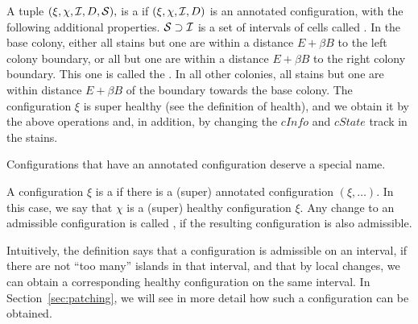 \documentclass[12pt]{memoir}
\newcommand{\fld}[1]{\ensuremath{\textit{#1}}}
\def\B{B}
\newcommand{\D}{D}
\newcommand{\E}{E}
\newcommand{\cInfo}{\fld{cInfo}}
\newcommand{\cState}{\fld{cState}}
\begin{document}
\begin{definition}\label{def:super-annotated}
A tuple \( (\xi,\chi,\cI,\D,\cS), \)
is a  if \( (\xi,\chi,\cI,\D) \) is an annotated configuration, 
with the following additional properties.
\( \mathcal{S} \supset \mathcal{I} \) is a set of intervals of cells called .
In the base colony, either all stains but one are
within a distance \( \E+\beta\B \) to the left colony boundary,
or all but one are within a distance \( \E+\beta\B \)
to the right colony boundary.
This one is called the .
In all other colonies, all stains but one are
within distance \( \E + \beta\B \) of the boundary towards the
base colony.
The configuration \( \xi \) is super healthy (see the definition of health), 
and we obtain it by the above operations and, in addition, by
changing the \( \cInfo \) and \( \cState \) track in the stains.
  
\end{definition}

Configurations that have an annotated configuration deserve
a special name.

\begin{definition}
\label{def:admissible-config}
    A configuration \( \xi \) is a  if there is a (super)
    annotated configuration  \( (\xi,\dots) \).
    In this case, we say that \( \chi \) is a (super) healthy
    configuration  \( \xi \).
    Any change to an admissible configuration is called 
    , if the resulting configuration is also admissible.
\end{definition}

Intuitively, the definition says that a configuration is
admissible on an interval, if there are not ``too many'' islands
in that interval, and that by local changes, we can obtain
a corresponding healthy configuration on the same interval.
In Section~\ref{sec:patching}, we will see in more detail how
such a configuration can be obtained.
\end{document}
